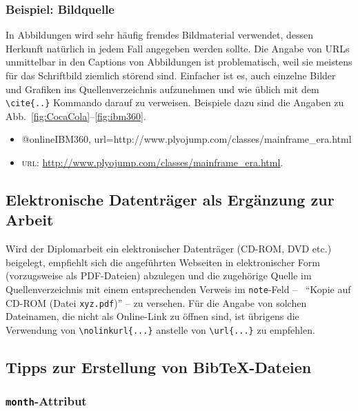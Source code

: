 \subsubsection{Beispiel: Bildquelle}

In Abbildungen wird sehr häufig fremdes Bildmaterial verwendet, dessen Herkunft natürlich 
in jedem Fall angegeben werden sollte. Die Angabe von URLs unmittelbar in den Captions von Abbildungen
ist problematisch, weil sie meistens für das Schriftbild ziemlich störend sind.
Einfacher ist es, auch einzelne Bilder und Grafiken ins Quellenverzeichnis aufzunehmen und
wie üblich mit dem \verb!\cite{..}! Kommando darauf zu verweisen.
Beispiele dazu sind die Angaben zu Abb.\ \ref{fig:CocaCola}--\ref{fig:ibm360}.
%
\begin{itemize}
\item[]
\begin{GenericCode}[numbers=none]
@online{IBM360,
	url={http://www.plyojump.com/classes/mainframe_era.html}
}
\end{GenericCode}
\item[\cite{IBM360}]
\textsc{url}: \url{http://www.plyojump.com/classes/mainframe_era.html}.
\end{itemize}
%

\subsection{Elektronische Datenträger als Ergänzung zur Arbeit}

Wird der Diplomarbeit ein elektronischer Datenträger (CD-ROM, DVD
etc.) beigelegt, empfiehlt sich die angeführten Webseiten in
elektronischer Form (vorzugsweise als PDF-Da\-tei\-en) abzulegen
und die zugehörige Quelle im Quellenverzeichnis mit einem 
entsprechenden Verweis im \texttt{note}-Feld -- \zB\
"`Kopie auf CD-ROM (Datei \nolinkurl{xyz.pdf})"' --
zu versehen.
Für die Angabe von solchen Dateinamen, die nicht als Online-Link
zu öffnen sind, ist übrigens die Verwendung von 
\verb!\nolinkurl{...}! anstelle von \verb!\url{...}! zu empfehlen.


\subsection{Tipps zur Erstellung von BibTeX-Dateien}
\label{sec:TippsZuBibtex}

\subsubsection{\texttt{month}-Attribut}

